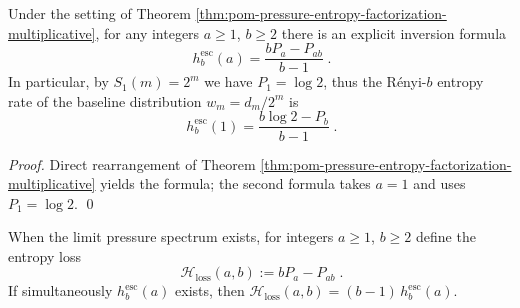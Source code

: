 \begin{corollary}\label{cor:pom-escort-renyi-rate-inversion}
Under the setting of Theorem \ref{thm:pom-pressure-entropy-factorization-multiplicative}, for any integers \(a\ge 1\), \(b\ge 2\) there is an explicit inversion formula
\[
\boxed{\;
h^{\mathrm{esc}}_b(a)=\frac{bP_a-P_{ab}}{b-1}\; }.
\]
In particular, by \(S_1(m)=2^m\) we have \(P_1=\log 2\), thus the R\'enyi-\(b\) entropy rate of the baseline distribution \(w_m=d_m/2^m\) is
\[
\boxed{\;
h^{\mathrm{esc}}_b(1)=\frac{b\log 2-P_{b}}{b-1}\; }.
\]
\end{corollary}
\begin{proof}
Direct rearrangement of Theorem \ref{thm:pom-pressure-entropy-factorization-multiplicative} yields the formula; the second formula takes \(a=1\) and uses \(P_1=\log 2\). \qed
\end{proof}

\begin{definition}\label{def:pom-entropy-loss-cocycle}
When the limit pressure spectrum exists, for integers \(a\ge 1\), \(b\ge 2\) define the entropy loss
\[
\boxed{\;
\mathcal{H}_{\mathrm{loss}}(a,b):=bP_a-P_{ab}\; }.
\]
If simultaneously \(h^{\mathrm{esc}}_b(a)\) exists, then
\(
\mathcal{H}_{\mathrm{loss}}(a,b)=(b-1)\,h^{\mathrm{esc}}_b(a)
\).
\end{definition}

